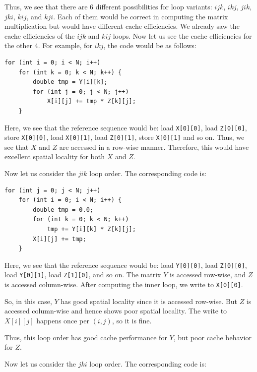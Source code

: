 \documentclass[12pt]{book}
\begin{document}
Thus, we see that there are 6 different possibilities for loop variants: $ijk$, $ikj$, $jik$, $jki$, $kij$, and $kji$. Each of them would be correct in computing the matrix multiplication but would have different cache efficiencies. We already saw the cache efficiencies of the $ijk$ and $kij$ loops. Now let us see the cache efficiencies for the other 4. For example, for $ikj$, the code would be as follows:

\begin{lstlisting}[style=cppstyle,caption={Matrix multiplication with loop order ikj}, label={lst:ikj-matmul}]
for (int i = 0; i < N; i++)
    for (int k = 0; k < N; k++) {
        double tmp = Y[i][k];
        for (int j = 0; j < N; j++)        
            X[i][j] += tmp * Z[k][j];
    }
\end{lstlisting}

Here, we see that the reference sequence would be: load \texttt{X[0][0]}, load \texttt{Z[0][0]}, store \texttt{X[0][0]}, load \texttt{X[0][1]}, load \texttt{Z[0][1]}, store \texttt{X[0][1]} and so on. Thus, we see that $X$ and $Z$ are accessed in a row-wise manner. Therefore, this would have excellent spatial locality for both $X$ and $Z$.

Now let us consider the $jik$ loop order. The corresponding code is:

\begin{lstlisting}[style=cppstyle,caption={Matrix multiplication with loop order jik}, label={lst:jik-matmul}]
for (int j = 0; j < N; j++)
    for (int i = 0; i < N; i++) {
        double tmp = 0.0;
        for (int k = 0; k < N; k++)
            tmp += Y[i][k] * Z[k][j];
        X[i][j] += tmp;
    }
\end{lstlisting}

Here, we see that the reference sequence would be: load \texttt{Y[0][0]}, load \texttt{Z[0][0]}, load \texttt{Y[0][1]}, load \texttt{Z[1][0]}, and so on. The matrix $Y$ is accessed row-wise, and $Z$ is accessed column-wise. After computing the inner loop, we write to \texttt{X[0][0]}.

So, in this case, $Y$ has good spatial locality since it is accessed row-wise. But $Z$ is accessed column-wise and hence shows poor spatial locality. The write to $X[i][j]$ happens once per $(i,j)$, so it is fine.

Thus, this loop order has good cache performance for $Y$, but poor cache behavior for $Z$.
 
Now let us consider the $jki$ loop order. The corresponding code is:
\end{document}
